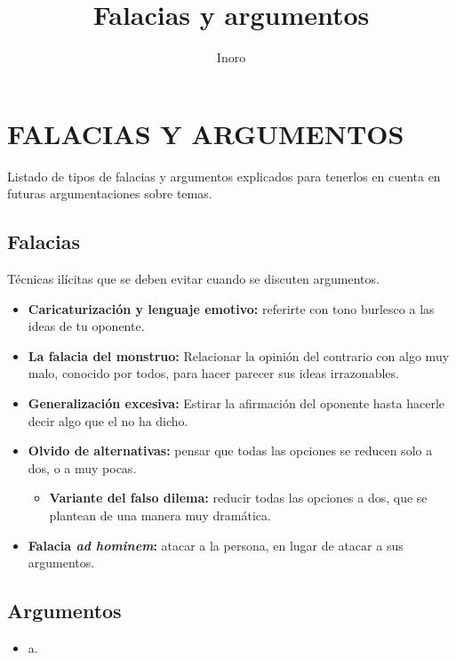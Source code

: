 \documentclass[12pt,a4paper,openbib]{article}
\author{Inoro}
\title{Falacias y argumentos}
\begin{document}
	\section{FALACIAS Y ARGUMENTOS}
	
	Listado de tipos de falacias y argumentos explicados para tenerlos en cuenta en futuras argumentaciones sobre temas.
	
	\subsection{Falacias}
	
	Técnicas ilícitas que se deben evitar cuando se discuten argumentos.
	
	\begin{itemize}
		\item \textbf{Caricaturización y lenguaje emotivo:} referirte con tono burlesco a las ideas de tu oponente.
		\item \textbf{La falacia del monstruo:} Relacionar la opinión del contrario con algo muy malo, conocido por todos, para hacer parecer sus ideas irrazonables.
		\item \textbf{Generalización excesiva:} Estirar la afirmación del oponente hasta hacerle decir algo que el no ha dicho.
		\item \textbf{Olvido de alternativas:} pensar que todas las opciones se reducen solo a dos, o a muy pocas.
			\begin{itemize}
				\item \textbf{Variante del falso dilema:} reducir todas las opciones a dos, que se plantean de una manera muy dramática.
			\end{itemize}
		\item \textbf{Falacia \textit{ad hominem}:} atacar a la persona, en lugar de atacar a sus argumentos.
	\end{itemize}
	
	\subsection{Argumentos}
	
	\begin{itemize}
		\item a.
	\end{itemize}
\end{document}
